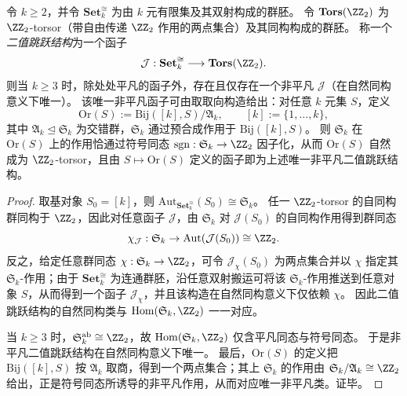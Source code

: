 \begin{theorem}[无外加寄存器与置换自然性约束下的二值跳跃结构唯一性]\label{thm:bdry-z2-jump-functor-uniqueness}
令 \(k\ge 2\)，并令 \(\mathbf{Set}_k^{\cong}\) 为由 \(k\) 元有限集及其双射构成的群胚。
令 \(\mathbf{Tors}(\ZZ_2)\) 为 \(\ZZ_2\)-torsor（带自由传递 \(\ZZ_2\) 作用的两点集合）及其同构构成的群胚。
称一个\emph{二值跳跃结构}为一个函子
\[
\mathcal J:\mathbf{Set}_k^{\cong}\longrightarrow \mathbf{Tors}(\ZZ_2).
\]
则当 \(k\ge 3\) 时，除处处平凡的函子外，存在且仅存在一个非平凡 \(\mathcal J\)（在自然同构意义下唯一）。
该唯一非平凡函子可由取取向构造给出：对任意 \(k\) 元集 \(S\)，定义
\[
\mathrm{Or}(S):=\mathrm{Bij}([k],S)\big/\mathfrak{A}_k,
\qquad [k]:=\{1,\dots,k\},
\]
其中 \(\mathfrak{A}_k\trianglelefteq\mathfrak{S}_k\) 为交错群，\(\mathfrak{S}_k\) 通过预合成作用于 \(\mathrm{Bij}([k],S)\)。
则 \(\mathfrak{S}_k\) 在 \(\mathrm{Or}(S)\) 上的作用恰通过符号同态 \(\operatorname{sgn}:\mathfrak{S}_k\to \ZZ_2\) 因子化，从而 \(\mathrm{Or}(S)\) 自然成为 \(\ZZ_2\)-torsor，且由 \(S\mapsto \mathrm{Or}(S)\) 定义的函子即为上述唯一非平凡二值跳跃结构。
\end{theorem}

\begin{proof}
取基对象 \(S_0=[k]\)，则 \(\mathrm{Aut}_{\mathbf{Set}_k^{\cong}}(S_0)\cong \mathfrak{S}_k\)。
任一 \(\ZZ_2\)-torsor 的自同构群同构于 \(\ZZ_2\)，因此对任意函子 \(\mathcal J\)，由 \(\mathfrak{S}_k\) 对 \(\mathcal J(S_0)\) 的自同构作用得到群同态
\[
\chi_{\mathcal J}:\mathfrak{S}_k\to \mathrm{Aut}(\mathcal J(S_0))\cong \ZZ_2.
\]
反之，给定任意群同态 \(\chi:\mathfrak{S}_k\to \ZZ_2\)，可令 \(\mathcal J_\chi(S_0)\) 为两点集合并以 \(\chi\) 指定其 \(\mathfrak{S}_k\)-作用；由于 \(\mathbf{Set}_k^{\cong}\) 为连通群胚，沿任意双射搬运可将该 \(\mathfrak{S}_k\)-作用推送到任意对象 \(S\)，从而得到一个函子 \(\mathcal J_\chi\)，并且该构造在自然同构意义下仅依赖 \(\chi\)。
因此二值跳跃结构的自然同构类与 \(\mathrm{Hom}(\mathfrak{S}_k,\ZZ_2)\) 一一对应。
\par
当 \(k\ge 3\) 时，\(\mathfrak{S}_k^{\mathrm{ab}}\cong \ZZ_2\)，故 \(\mathrm{Hom}(\mathfrak{S}_k,\ZZ_2)\) 仅含平凡同态与符号同态。
于是非平凡二值跳跃结构在自然同构意义下唯一。
最后，\(\mathrm{Or}(S)\) 的定义把 \(\mathrm{Bij}([k],S)\) 按 \(\mathfrak{A}_k\) 取商，得到一个两点集合；其上 \(\mathfrak{S}_k\) 的作用由 \(\mathfrak{S}_k/\mathfrak{A}_k\cong \ZZ_2\) 给出，正是符号同态所诱导的非平凡作用，从而对应唯一非平凡类。证毕。
\end{proof}

